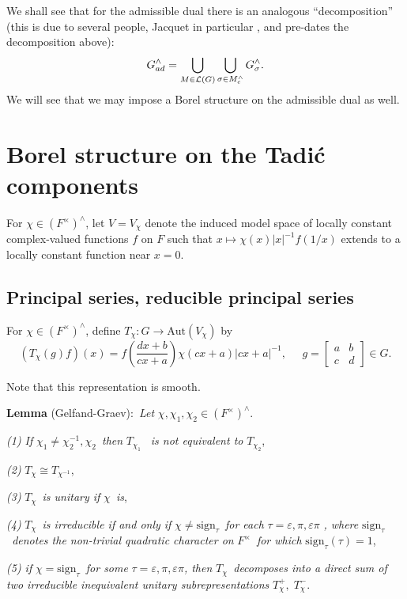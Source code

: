 \documentclass[11pt, a4paper]{article}
\begin{document}
We shall see that for the admissible dual there is an analogous
``decomposition'' (this is due to several people, Jacquet in particular \cite{Ca},
and pre-dates the decomposition above):
\[
G_{ad}^{\wedge }=\bigcup_{M\in {\cal L}(G)}
\bigcup_{\sigma \in M_c^{\wedge}}G_\sigma ^{\wedge }.
\]
We will see that we may impose a Borel structure on the admissible dual as
well.

\section{Borel structure on the Tadi\'c components}

For $\chi \in (F^{\times })^{\wedge }$, let $V=V_\chi $ denote the induced model space of locally constant
complex-valued functions $f$ on $F$ such that $x\longmapsto \chi (x)|x|^{-1}f(1/x)$ extends to a locally constant function near $x=0$.

\subsection{Principal series, reducible principal series}

For $\chi \in (F^{\times })^{\wedge }$, define $T_\chi :G\rightarrow \mathrm{Aut}(V_\chi )$
by
\[
(T_\chi (g)f)(x)=f\left(\frac{dx+b}{cx+a}\right)\chi
(cx+a)|cx+a|^{-1},\;\;\;\;\;g=\left[ 
\begin{array}{cc}
a & b \\ 
c & d
\end{array}
\right] \in G.
\]

Note that this representation is smooth.

{\bf Lemma} (Gelfand-Graev):{\em \ Let }$\chi ,\chi _1,\chi _2\in (F^{\times
})^{\wedge }$.

{\em (1) If }$\chi _1\neq \chi _2^{-1},\chi _2${\em \ then }$T_{\chi _1}$%
{\em \ is not equivalent to }$T_{\chi _2}$,

{\em (2) }$T_\chi \cong T_{\chi ^{-1}}$,

{\em (3) }$T_\chi ${\em \ is unitary if }$\chi ${\em \ is},

{\em (4) }$T_\chi ${\em \ is irreducible if and only if }$\chi \neq
\mathrm{sign}_\tau ${\em \ for each }$\tau =\varepsilon ,\pi ,\varepsilon \pi ${\em %
, where }$\mathrm{sign}_\tau ${\em \ denotes the non-trivial quadratic character on }$%
F^{\times }${\em \ for which }$\mathrm{sign}_\tau (\tau )=1$,

{\em (5) if }$\chi =\mathrm{sign}_\tau ${\em \ for some }$\tau =\varepsilon ,\pi
,\varepsilon \pi ${\em , then }$T_\chi ${\em \ decomposes into a direct sum
of two irreducible inequivalent unitary subrepresentations }$T_\chi
^{+},\;T_\chi ^{-}$.
\end{document}
